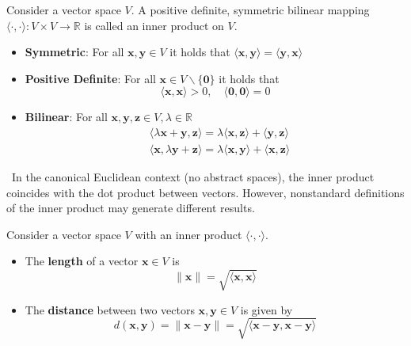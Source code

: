 \documentclass[10pt,a4paper]{Template}
\begin{document}
\begin{minipage}{0.48\textwidth}
Consider a vector space $V$. A positive definite, symmetric bilinear mapping $\langle\cdot, \cdot\rangle: V \times V \rightarrow \mathbb{R}$ is called an inner product on $V$. 
\vspace{0.10cm}
\begin{itemize}
    \item \textbf{Symmetric}: For all $\boldsymbol{x}, \boldsymbol{y} \in V$ it holds that $\langle\boldsymbol{x}, \boldsymbol{y}\rangle=\langle\boldsymbol{y}, \boldsymbol{x}\rangle$
    \item \textbf{Positive Definite}: For all $\boldsymbol{x} \in V \backslash\{\mathbf{0}\}$ it holds that
    \[
    \langle\boldsymbol{x}, \boldsymbol{x}\rangle>0, \quad\langle\mathbf{0}, \mathbf{0}\rangle=0
    \]
    \item \textbf{Bilinear}: For all $\boldsymbol{x}, \boldsymbol{y}, \boldsymbol{z} \in V, \lambda \in \mathbb{R}$
    \[
    \begin{aligned}
    & \langle\lambda \boldsymbol{x}+\boldsymbol{y}, \boldsymbol{z}\rangle=\lambda\langle\boldsymbol{x}, \boldsymbol{z}\rangle+\langle\boldsymbol{y}, \boldsymbol{z}\rangle \\
    & \langle\boldsymbol{x}, \lambda \boldsymbol{y}+\boldsymbol{z}\rangle=\lambda\langle\boldsymbol{x}, \boldsymbol{y}\rangle+\langle\boldsymbol{x}, \boldsymbol{z}\rangle
    \end{aligned}
    \]
\end{itemize}

{\small \faLightbulb} \ In the canonical Euclidean context (no abstract spaces), the inner product coincides with the dot product between vectors. However, nonstandard definitions of the inner product may generate different results.

\divider


Consider a vector space $V$ with an inner product $\langle\cdot, \cdot\rangle$. \\

\begin{itemize}
    \item The \textbf{length} of a vector $\boldsymbol{x} \in V$ is
    \[
    \|\boldsymbol{x}\|=\sqrt{\langle \boldsymbol{x}, \boldsymbol{x}\rangle}
    \]
    \item The \textbf{distance} between two vectors $\boldsymbol{x}, \boldsymbol{y} \in V$ is given by
    \[
    d(\boldsymbol{x}, \boldsymbol{y})=\|\boldsymbol{x}-\boldsymbol{y}\|=\sqrt{\langle \boldsymbol{x}-\boldsymbol{y}, \boldsymbol{x}-\boldsymbol{y}\rangle}
    \]
\end{itemize}


\end{minipage}
\end{document}
